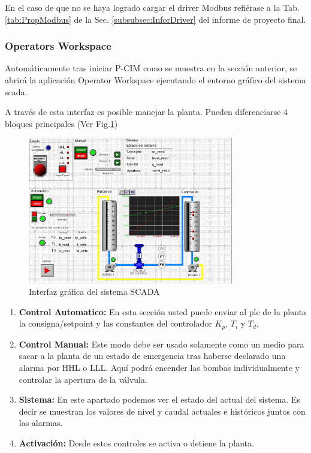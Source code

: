 \begin{lattention}
En el caso de que no se haya logrado cargar el driver Modbus refiérase a la 
Tab. \ref{tab:PropModbus} de la Sec. \ref{subsubsec:InforDriver} del informe
de proyecto final.
\end{lattention}

\subsubsection{Operators Workspace}

Automáticamente tras iniciar P-CIM como se muestra en la sección anterior, se 
abrirá la aplicación Operator Workspace ejecutando el entorno gráfico del 
sistema \gls{scada}.

A través de esta interfaz es posible manejar la planta.
Pueden diferenciarse 4 bloques principales (Ver Fig.\ref{fig:hmiscada2})
\begin{figure}[!ht]
	\centering
	\includegraphics[width=0.8\textwidth]
	{Cap5-SCADA/images/hmiScada.jpeg}
	\caption{Interfaz gráfica del sistema SCADA}
	\label{fig:hmiscada2}
  \end{figure}
  
\begin{enumerate}
 \item \textbf{Control Automatico:} En esta sección usted puede enviar al
\gls{plc} de la planta la consigna/setpoint y las constantes del controlador
$K_p$, $T_i$ y $T_d$.
 \item \textbf{Control Manual:} Este modo debe ser usado solamente como un
medio para
sacar a la planta de un estado de emergencia tras  haberse declarado una alarma
por HHL o LLL.
Aquí podrá encender las bombas individualmente y controlar la apertura de la
válvula.
 \item \textbf{Sistema:} En este apartado podemos ver el estado del actual del
sistema.
Es decir se muestran los valores de nivel y caudal actuales e históricos juntos
con las alarmas.
 \item \textbf{Activación:} Desde estos controles se activa o detiene la
planta.
\end{enumerate}

